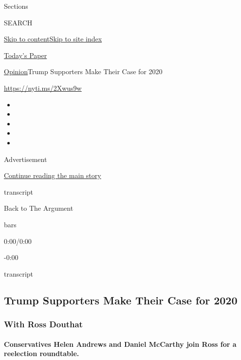 Sections

SEARCH

\protect\hyperlink{site-content}{Skip to
content}\protect\hyperlink{site-index}{Skip to site index}

\href{https://myaccount.nytimes.com/auth/login?response_type=cookie\&client_id=vi}{}

\href{https://www.nytimes.com/section/todayspaper}{Today's Paper}

\href{/section/opinion}{Opinion}\textbar{}Trump Supporters Make Their
Case for 2020

\href{https://nyti.ms/2Xwus9w}{https://nyti.ms/2Xwus9w}

\begin{itemize}
\item
\item
\item
\item
\item
\end{itemize}

Advertisement

\protect\hyperlink{after-top}{Continue reading the main story}

transcript

Back to The Argument

bars

0:00/0:00

-0:00

transcript

\hypertarget{trump-supporters-make-their-case-for-2020}{%
\subsection{Trump Supporters Make Their Case for
2020}\label{trump-supporters-make-their-case-for-2020}}

\hypertarget{with-ross-douthat}{%
\subsubsection{With Ross Douthat}\label{with-ross-douthat}}

\hypertarget{conservatives-helen-andrews-and-daniel-mccarthy-join-ross-for-a-reelection-roundtable}{%
\paragraph{Conservatives Helen Andrews and Daniel McCarthy join Ross for
a reelection
roundtable.}\label{conservatives-helen-andrews-and-daniel-mccarthy-join-ross-for-a-reelection-roundtable}}

